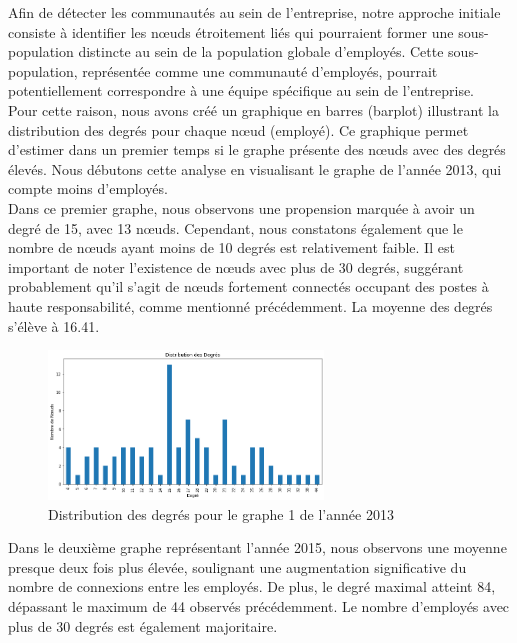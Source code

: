\documentclass{article}
\begin{document}
Afin de détecter les communautés au sein de l'entreprise, notre approche initiale consiste à identifier les nœuds étroitement liés qui pourraient former une sous-population distincte au sein de la population globale d'employés. Cette sous-population, représentée comme une communauté d'employés, pourrait potentiellement correspondre à une équipe spécifique au sein de l'entreprise. \\

Pour cette raison, nous avons créé un graphique en barres (barplot) illustrant la distribution des degrés pour chaque nœud (employé). Ce graphique permet d'estimer dans un premier temps si le graphe présente des nœuds avec des degrés élevés. Nous débutons cette analyse en visualisant le graphe de l'année 2013, qui compte moins d'employés. \\

Dans ce premier graphe, nous observons une propension marquée à avoir un degré de 15, avec 13 nœuds. Cependant, nous constatons également que le nombre de nœuds ayant moins de 10 degrés est relativement faible. Il est important de noter l'existence de nœuds avec plus de 30 degrés, suggérant probablement qu'il s'agit de nœuds fortement connectés occupant des postes à haute responsabilité, comme mentionné précédemment. La moyenne des degrés s'élève à 16.41.

\begin{figure}[!h]
    \centering
    \includegraphics[width=0.65\textwidth]{assets/communaute/distribution_deg_2013}
    \caption{Distribution des degrés pour le graphe 1 de l'année 2013}
    \label{fig:distribution_deg_2013}
\end{figure}

Dans le deuxième graphe représentant l'année 2015, nous observons une moyenne presque deux fois plus élevée, soulignant une augmentation significative du nombre de connexions entre les employés. De plus, le degré maximal atteint 84, dépassant le maximum de 44 observés précédemment. Le nombre d'employés avec plus de 30 degrés est également majoritaire. \\
\end{document}
